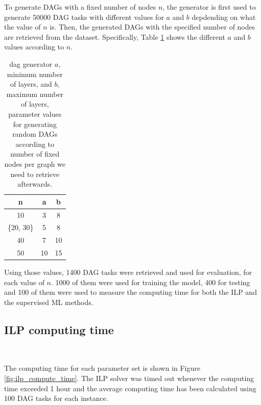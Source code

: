 To generate DAGs with a fixed number of nodes $n$, 
the generator is first used to generate 50000 DAG tasks
with different values for $a$ and $b$ depdending on what 
the value of $n$ is. Then, the generated DAGs with 
the specified number of nodes are retrieved from the dataset.
Specifically, Table \ref{tab:layer_num_minmax} 
shows the different $a$ and $b$ values according to $n$.

\begin{table}
    \centering
    \begin{tabular}{|c|c|c|}    
        \hline
        \textbf{n} & \textbf{a} & \textbf{b} \\
        \hline
        10 & 3 & 8 \\
        \hline
        \{20, 30\} & 5 & 8 \\
        \hline
        40 & 7 & 10 \\
        \hline
        50 & 10 & 15 \\
        \hline
    \end{tabular}
    \caption{dag generator $a$, minimum number of layers, and $b$, maximum
    number of layers, parameter values for generating 
    random DAGs according to number of fixed nodes per graph we need to retrieve afterwards.}
    \label{tab:layer_num_minmax}
\end{table}

Using those values, 1400 DAG tasks were retrieved and used for 
evaluation, for each value of $n$.
1000 of them were used for training the model, 400 for testing
and 100 of them were used to measure the computing time 
for both the ILP and the supervised ML methods.


\subsection{ILP computing time}
~

The computing time for each parameter set is shown 
in Figure \ref{fig:ilp_compute_time}.
The ILP solver was timed out whenever the computing time exceeded 1 hour
and the average computing time has been calculated using 100 DAG tasks for each instance.

